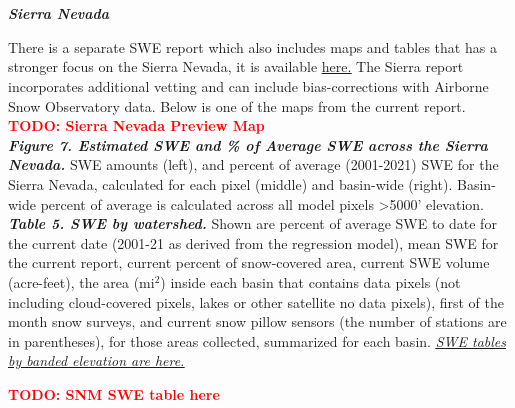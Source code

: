 \documentclass{article}
\begin{document}
\newpage
\section*{}\label{sec:snm}
\fontsize{12}{16}
\noindent\textbf{\textit{Sierra Nevada}}
\fontsize{10}{14}

\noindent There is a separate SWE report which also includes maps and tables that has a stronger focus on the Sierra Nevada, it is available \href{https://github.com/CU-Mountain-Hydrology/SierraNevada}{\underline{here.}} The Sierra report incorporates additional vetting and can include bias-corrections with Airborne Snow Observatory data. Below is one of the maps from the current report.\\

\textcolor{red}{\textbf{TODO: Sierra Nevada Preview Map}}\\

\noindent\textbf{\textit{Figure 7. Estimated SWE and \% of Average SWE across the Sierra Nevada.}} SWE amounts (left), and percent of average (2001-2021) SWE for the Sierra Nevada, calculated for each pixel (middle) and basin-wide (right). Basin-wide percent of average is calculated across all model pixels >5000’ elevation.\\

\noindent\textbf{\textit{Table 5. SWE by watershed.}} Shown are percent of average SWE to date for the current date (2001-21 as derived from the regression model), mean SWE for the current report, current percent of snow-covered area, current SWE volume (acre-feet), the area (mi$^2$) inside each basin that contains data pixels (not including cloud-covered pixels, lakes or other satellite no data pixels), first of the month snow surveys, and current snow pillow sensors (the number of stations are in parentheses), for those areas collected, summarized for each basin. \hyperref[sec:elev_band_swe]{\underline{\textit{SWE tables by banded elevation are here.}}}

\textcolor{red}{\textbf{TODO: SNM SWE table here}}\\

\newpage
\end{document}

